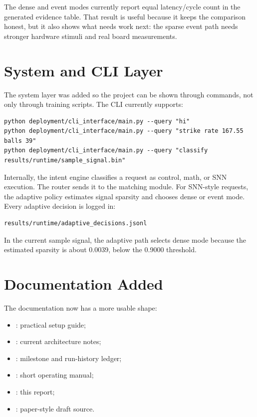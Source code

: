 \documentclass[11pt]{article}
\begin{document}
The dense and event modes currently report equal latency/cycle count in the
generated evidence table. That result is useful because it keeps the comparison
honest, but it also shows what needs work next: the sparse event path needs
stronger hardware stimuli and real board measurements.

\section{System and CLI Layer}
The system layer was added so the project can be shown through commands, not only
through training scripts. The CLI currently supports:
\begin{lstlisting}[style=plaincmd]
python deployment/cli_interface/main.py --query "hi"
python deployment/cli_interface/main.py --query "strike rate 167.55 balls 39"
python deployment/cli_interface/main.py --query "classify results/runtime/sample_signal.bin"
\end{lstlisting}

Internally, the intent engine classifies a request as control, math, or SNN
execution. The router sends it to the matching module. For SNN-style requests,
the adaptive policy estimates signal sparsity and chooses dense or event mode.
Every adaptive decision is logged in:
\begin{lstlisting}[style=plaincmd]
results/runtime/adaptive_decisions.jsonl
\end{lstlisting}

In the current sample signal, the adaptive path selects dense mode because the
estimated sparsity is about 0.0039, below the 0.9000 threshold.

\section{Documentation Added}
The documentation now has a more usable shape:
\begin{itemize}[leftmargin=*]
\item {}: practical setup guide;
\item {}: current architecture notes;
\item {}: milestone and run-history ledger;
\item {}: short operating manual;
\item {}: this report;
\item {}: paper-style draft source.
\end{itemize}
\end{document}
